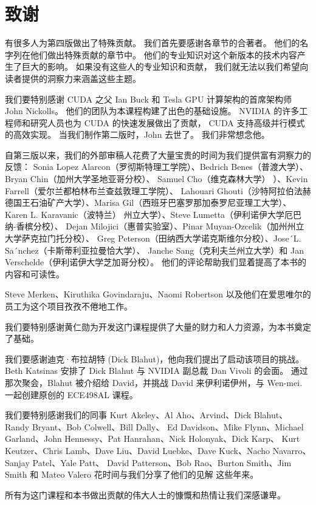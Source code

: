\section*{致谢}
有很多人为第四版做出了特殊贡献。 我们首先要感谢各章节的合著者。 他们的名字列在他们做出特殊贡献的章节中。 
他们的专业知识对这个新版本的技术内容产生了巨大的影响。 如果没有这些人的专业知识和贡献，
我们就无法以我们希望向读者提供的洞察力来涵盖这些主题。

我们要特别感谢 CUDA 之父 Ian Buck 和 Tesla GPU 计算架构的首席架构师 John Nickolls。 
他们的团队为本课程构建了出色的基础设施。 NVIDIA 的许多工程师和研究人员也为 CUDA 的快速发展做出了贡献，
CUDA 支持高级并行模式的高效实现。 当我们制作第二版时，John 去世了。 我们非常想念他。

自第三版以来，我们的外部审稿人花费了大量宝贵的时间为我们提供富有洞察力的反馈：
Sonia Lopez Alarcon（罗彻斯特理工学院）、Bedrich Benes（普渡大学）、Bryan Chin（加州大学圣地亚哥分校）、
Samuel Cho（维克森林大学） ）、Kevin Farrell（爱尔兰都柏林布兰查兹敦理工学院）、
Lahouari Ghouti（沙特阿拉伯法赫德国王石油矿产大学）、Marisa Gil（西班牙巴塞罗那加泰罗尼亚理工大学）、
Karen L. Karavanic（波特兰） 州立大学）、Steve Lumetta（伊利诺伊大学厄巴纳-香槟分校）、
Dejan Milojici（惠普实验室）、Pinar Muyan-Ozcelik（加州州立大学萨克拉门托分校）、
Greg Peterson（田纳西大学诺克斯维尔分校）、Jose´L. Sa´nchez（卡斯蒂利亚拉曼恰大学）、
Janche Sang（克利夫兰州立大学）和 Jan Verschelde（伊利诺伊大学芝加哥分校）。 
他们的评论帮助我们显着提高了本书的内容和可读性。

Steve Merken、Kiruthika Govindaraju、Naomi Robertson 以及他们在爱思唯尔的员工为这个项目孜孜不倦地工作。

我们要特别感谢黄仁勋为开发这门课程提供了大量的财力和人力资源，为本书奠定了基础。

我们要感谢迪克·布拉胡特 (Dick Blahut)，他向我们提出了启动该项目的挑战。 
Beth Katsinas 安排了 Dick Blahut 与 NVIDIA 副总裁 Dan Vivoli 的会面。 
通过那次聚会，Blahut 被介绍给 David，并挑战 David 来伊利诺伊州，与 Wen-mei. 一起创建原创的 ECE498AL 课程。

我们要特别感谢我们的同事 Kurt Akeley、Al Aho、Arvind、Dick Blahut、Randy Bryant、Bob Colwell、Bill Dally、
Ed Davidson、Mike Flynn、Michael Garland、John Hennessy、Pat Hanrahan、Nick Holonyak、Dick Karp、
Kurt Keutzer、Chris Lamb、Dave Liu、David Luebke、Dave Kuck、Nacho Navarro、Sanjay Patel、Yale Patt、
David Patterson、Bob Rao、Burton Smith、Jim Smith 和 Mateo Valero 花时间与我们分享了他们的见解 这些年来。

所有为这门课程和本书做出贡献的伟大人士的慷慨和热情让我们深感谦卑。
